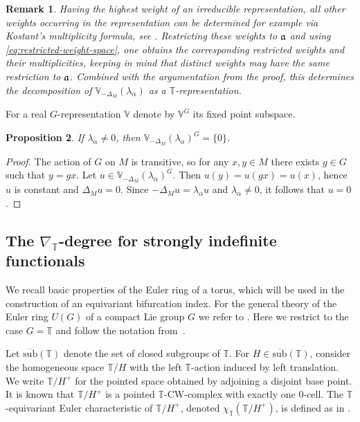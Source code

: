 \documentclass[reqno,twoside,12pt]{amsart}
\newtheorem{Remark}{Remark}[section]
\newtheorem{Proposition}[Remark]{Proposition}
\newcommand{\bT}{\mathbb{T}}
\newcommand{\bV}{\mathbb{V}}
\numberwithin{equation}{section} \errorcontextlines=0
\newcommand{\sub}{\overline{\mathrm{sub}}}
\begin{document}
\begin{Remark}
Having the highest weight of an irreducible representation, all other weights occurring in the representation can be determined for example via Kostant's multiplicity formula, see \cite[Chapter VI, Thm. 3.2]{BrockerDieck}. Restricting these weights to $\frak a$ and using \eqref{eq:restricted-weight-space}, one obtains the corresponding restricted weights and their multiplicities, keeping in mind that distinct weights may have the same restriction to $\frak a$. Combined with the argumentation from the proof, this determines the decomposition of $\bV_{-\Delta_M}(\lambda_\alpha)$ as a $\bT$-representation.
\end{Remark}

For a real $G$-representation $\bV$ denote by $\bV^G$ its fixed point subspace.

\begin{Proposition}\label{prop:fixed-point}
If $\lambda_\alpha\neq 0$, then $\bV_{-\Delta_M}(\lambda_\alpha)^G=\{0\}$.
\end{Proposition}
\begin{proof}
The action of $G$ on $M$ is transitive, so for any $x,y\in M$ there exists $g\in G$ such that $y=gx$. Let $u\in\bV_{-\Delta_M}(\lambda_\alpha)^G$. Then $u(y)=u(gx)=u(x)$, hence $u$ is constant and $\Delta_M u=0$. Since $-\Delta_M u=\lambda_\alpha u$ and $\lambda_\alpha\neq 0$, it follows that $u=0$.
\end{proof}





\subsection{The $\nabla_\bT$-degree for strongly indefinite functionals}\label{subsec:degree}
We recall basic properties of the Euler ring of a torus, which will be used in the construction of an equivariant bifurcation index. For the general theory of the Euler ring $U(G)$ of a compact Lie group $G$ we refer to \cite{TomDieck1979,TomDieck}. Here we restrict to the case $G=\bT$ and follow the notation from~\cite{GarRyb}.

Let $\sub(\bT)$ denote the set of closed subgroups of $\bT$. For $H\in\sub(\bT)$, consider the homogeneous space $\bT/H$ with the left $\bT$-action induced by left translation. We write $\bT/H^+$ for the pointed space obtained by adjoining a disjoint base point. It is known that $\bT/H^+$ is a pointed $\bT$-CW-complex with exactly one $0$-cell. The $\bT$-equivariant Euler characteristic of $\bT/H^+$, denoted $\chi_\bT(\bT/H^+)$, is defined as in \cite[Definition 2.3]{GarRyb}.
\end{document}
